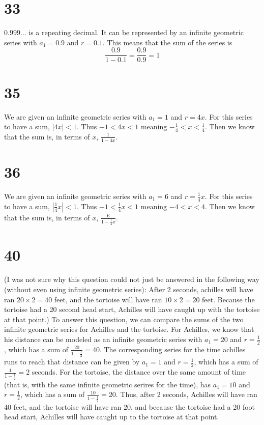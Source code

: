 \documentclass{article}
\theoremstyle{definition}
\newcommand{\?}{\stackrel{?}{=}}
\begin{document}
\section*{33}
$0.999...$ is a repeating decimal. It can be represented by an infinite geometric series with $a_1=0.9$ and $r=0.1$. This means that the sum of the series is
\[ \frac{0.9}{1-0.1}=\frac{0.9}{0.9}=1 \]

\section*{35}
We are given an infinite geometric series with $a_1=1$ and $r=4x$. For this series to have a sum, $|4x|<1$. Thus $-1<4x<1$ meaning $-\frac{1}{4}<x<\frac{1}{4}$.
Then we know that the sum is, in terms of $x$, $\frac{1}{1-4x}$.

\section*{36}
We are given an infinite geometric series with $a_1=6$ and $r=\frac{1}{4}x$. For this series to have a sum, $|\frac{1}{4}x|<1$. 
Thus $-1<\frac{1}{4}x<1$ meaning $-4<x<4$. Then we know that the sum is, in terms of $x$, $\frac{6}{1-\frac{1}{4}x}$. 

\section*{40}
(I was not sure why this question could not just be answered in the following way (without even using infinite geometric series): 
After 2 seconds, achilles will have ran $20\times 2=40$ feet, and the tortoise will have ran
$10\times 2=20$ feet. Because the tortoise had a 20 second head start, Achilles will have caught up with the tortoise at that point.)\newline
To answer this question, we can compare the sums of the two infinite geometric series for Achilles and the tortoise. For Achilles, we know that 
his distance can be modeled as an infinite geometric series with $a_1=20$ and $r=\frac{1}{2}$, which has a sum of $\frac{20}{1-\frac{1}{2}}=40$. 
The corresponding series for the time achilles runs to reach that distance can be given by $a_1=1$ and $r=\frac{1}{2}$, which has a sum of 
$\frac{1}{1-\frac{1}{2}}=2$ seconds. For the tortoise, the distance over the same amount of time (that is, with the same infinite geometric serires for the time), has 
$a_1=10$ and $r=\frac{1}{2}$, which has a sum of $\frac{10}{1-\frac{1}{2}}=20$. Thus, after 2 seconds, Achilles will have ran $40$ feet, and the tortoise will have ran $20$,
and because the tortoise had a 20 foot head start, Achilles will have caught up to the tortoise at that point.
\end{document}

